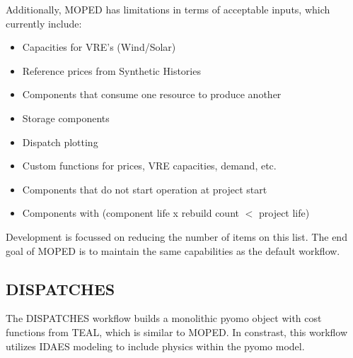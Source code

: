 Additionally, MOPED has limitations in terms of acceptable inputs, which currently include:
\begin{itemize}
    \item Capacities for VRE's (Wind/Solar)
    \item Reference prices from Synthetic Histories
    \item Components that consume one resource to produce another
    \item Storage components
    \item Dispatch plotting
    \item Custom functions for prices, VRE capacities, demand, etc.
    \item Components that do not start operation at project start
    \item Components with (component life x rebuild count $<$ project life)
\end{itemize}
Development is focussed on reducing the number of items on this list. The end goal of MOPED is to maintain the same capabilities as the default workflow.

\subsection{DISPATCHES}
The DISPATCHES workflow builds a monolithic pyomo object with cost functions from TEAL, which is similar to MOPED. In constrast, this workflow utilizes IDAES modeling to include physics within the pyomo model.

